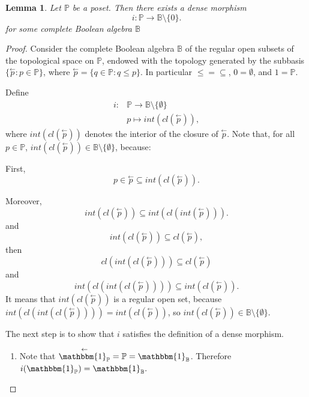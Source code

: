 \documentclass[10pt,longbibliography]{article}
\newtheorem{Lemma}[Theo]{Lemma}
\newcommand{\One}{\mathbbm{1}}
\newcommand{\Po}{\mathbb{P}}
\newcommand{\B}{\mathbb{B}}
\newcommand{\lp}{\overset{\leftarrow}{p}}
\begin{document}
\begin{Lemma}\label{canonicaldensemorphism}
	Let $\Po$ be a poset. Then there exists a dense morphism
	$$i: \Po \longrightarrow \B \setminus \{0\}.$$
    for some complete Boolean algebra $\B$
\end{Lemma}
\begin{proof}
Consider the complete Boolean algebra $\B$ of the regular open subsets of the topological space  on $\Po$, endowed with the topology  generated by the subbasis $\{\overset{\leftarrow}{p} : p \in \Po\}$, where $\overset{\leftarrow}{p} = \{q \in \Po: q \leq p\}$. In particular $\leq = \subseteq$, $0 = \emptyset$, and $1 = \Po$.

	Define 
	\begin{align*}
		i : &\Po \longrightarrow \B \setminus \{\emptyset\} \\
		    &p \mapsto int(cl(\overset{\leftarrow}{p})),
	\end{align*}
	where $int(cl(\overset{\leftarrow}{p}))$ denotes the interior of the closure of $\overset{\leftarrow}{p}$. Note that, for all $p \in \Po$, $int(cl(\lp)) \in \B \setminus \{\emptyset\}$, because:
	
	First,
    $$p \in \lp \subseteq int(cl(\lp)).$$

    Moreover,
	$$int(cl(\lp)) \subseteq int(cl(int(\lp))).$$
	and
	$$int(cl(\lp)) \subseteq cl(\lp),$$
	then
	$$cl(int(cl(\lp))) \subseteq cl(\lp)$$
	and
	$$int(cl(int(cl(\lp)))) \subseteq int(cl(\lp)).$$
	It means that $int(cl(\lp))$ is a regular open set, because $int(cl(int(cl(\lp)))) = int(cl(\lp))$, so $int(cl(\lp)) \in \B \setminus \{\emptyset\}$.
	
	The next step is to show that $i$ satisfies the definition of a dense morphism.
	\begin{enumerate}
		\item Note that $\overset{\leftarrow}{\One_{\Po}} = \Po = \One_{\B}$. Therefore $i(\One_{\Po}) = \One_{\B}.$
		

\end{enumerate}
\end{proof}
\end{document}
